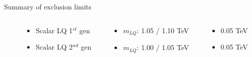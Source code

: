\documentclass[8pt]{beamer}
\begin{document}
\begin{frame}{\large Summary of exclusion limits}
  \begin{columns}
  \begin{column}{3cm}
  \end{column}
  \begin{column}{3cm}
    \begin{itemize}
     \item[\JackStar] Scalar LQ 1$^{st}$ gen
     \item[\JackStar] Scalar LQ 2$^{nd}$ gen
    \end{itemize}
  \end{column}
  \begin{column}{3.3cm}
    \begin{itemize}
     \item[] $m_{LQ}$: 1.05 / 1.10 TeV
     \item[] $m_{LQ}$: 1.00 / 1.05 TeV
    \end{itemize}
  \end{column}
  \begin{column}{2.7cm}
    \begin{itemize}
     \item[] 0.05 TeV
     \item[] 0.05 TeV
    \end{itemize}
  \end{column}
 \end{columns}
 
 
 
 
    


\end{frame}
\end{document}
